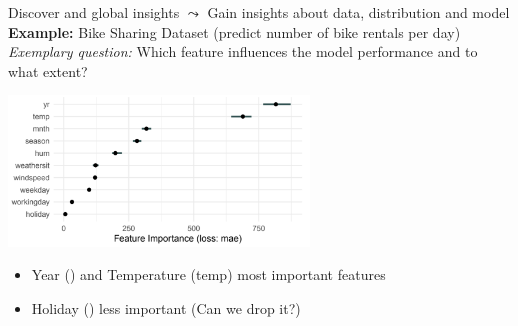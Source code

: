 \documentclass[11pt,compress,t,notes=noshow, aspectratio=169, xcolor=table]{beamer}
\begin{document}



\begin{frame}{Discover and global insights}
$\leadsto$ Gain insights about data, distribution and model \\
\medskip
\textbf{Example:} Bike Sharing Dataset (predict number of bike rentals per day) \\
\textit{Exemplary question:} Which feature influences the model performance and to what extent?
\begin{center}
\includegraphics[width=0.6\textwidth]{figure/bike-sharing02.png}
\end{center}


\begin{itemize}
    \item Year () and Temperature (temp) most important features
    \item Holiday () less important (Can we drop it?)
\end{itemize}

\end{frame}

\end{document}
